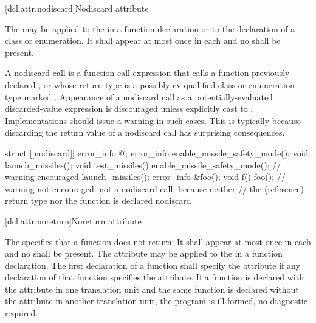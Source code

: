 [dcl.attr.nodiscard]{Nodiscard attribute}%

\pnum
The  
may be applied to the 
in a function declaration or to the declaration of a class or enumeration.
It shall appear at most once in each  and
no  shall be present.

\pnum
\begin{note}
A nodiscard call is a function call expression that
calls a function previously declared , or
whose return type is a possibly cv-qualified class or enumeration type
marked . Appearance of a nodiscard call as
a potentially-evaluated discarded-value expression
is discouraged unless explicitly cast to .
Implementations should issue a warning in such cases.
This is typically because discarding the return value
of a nodiscard call has surprising consequences.
\end{note}

\pnum
\begin{example}
\begin{codeblock}
struct [[nodiscard]] error_info { @\commentellip@ };
error_info enable_missile_safety_mode();
void launch_missiles();
void test_missiles() {
  enable_missile_safety_mode(); // warning encouraged
  launch_missiles();
}
error_info &foo();
void f() { foo(); }             // warning not encouraged: not a nodiscard call, because neither
                                // the (reference) return type nor the function is declared nodiscard
\end{codeblock}
\end{example}

[dcl.attr.noreturn]{Noreturn attribute}%

\pnum
The   specifies that a function does not return. It
shall appear at most once in each  and no
 shall be present. The attribute may be applied to the
 in a function declaration. The first declaration of a function shall
specify the  attribute if any declaration of that function specifies the
 attribute. If a function is declared with the  attribute in one
translation unit and the same function is declared without the  attribute in another
translation unit, the program is ill-formed, no diagnostic required.


